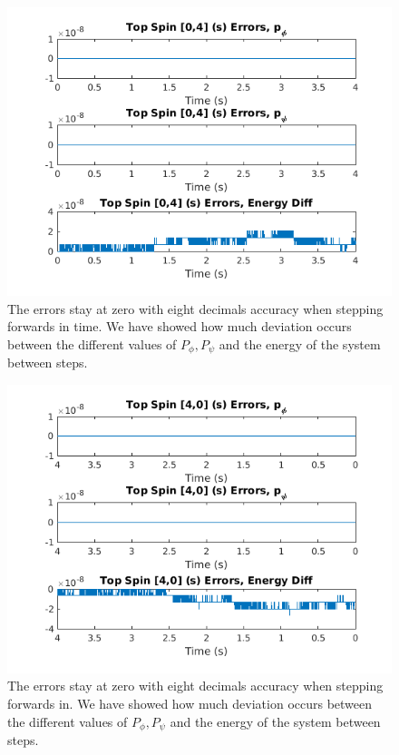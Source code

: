 \documentclass[11pt]{article}
\begin{document}
\begin{figure}[H]
	\centering
	\includegraphics[width=1\textwidth]{../ex3/plots/forwardDataError.png}
	\caption{The errors stay at zero with eight decimals accuracy when stepping forwards in time. We have showed how much deviation occurs between the different values of $P_{\phi}, P_{\psi}$ and the energy of the system between steps.}
	\label{fig:forwardDataErrorHAM}
\end{figure}

\begin{figure}[H]
	\centering
	\includegraphics[width=1\textwidth]{../ex3/plots/backwardDataError.png}
	\caption{The errors stay at zero with eight decimals accuracy when stepping forwards in. We have showed how much deviation occurs between the different values of $P_{\phi}, P_{\psi}$ and the energy of the system between steps.}
	\label{fig:backwardDataErrorHAM}
\end{figure}
\end{document}
